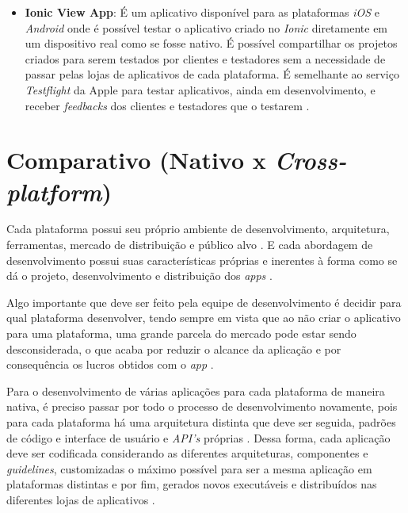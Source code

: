\begin{itemize}
    \item \textbf{Ionic View App}: É um aplicativo disponível para as plataformas \textit{iOS} e \textit{Android} onde é possível testar o 
    aplicativo criado no \textit{Ionic} diretamente em um dispositivo real como se fosse nativo. É possível compartilhar os projetos criados para serem
    testados por clientes e testadores sem a necessidade de passar pelas lojas de aplicativos de cada plataforma. É semelhante ao serviço 
    \textit{Testflight} da Apple para testar aplicativos, ainda em desenvolvimento, e receber \textit{feedbacks} dos clientes e testadores que o testarem \cite{drifty_ionic_2016-5}. 
     
\end{itemize}

\section{Comparativo (Nativo x \textit{Cross-platform})} \label{section:comparativo}



Cada plataforma possui seu próprio ambiente de desenvolvimento, arquitetura, ferramentas, mercado de distribuição e público alvo \cite{shakshuki_4th_2013}.
E cada abordagem de desenvolvimento possui suas características próprias e inerentes à forma como se dá o projeto, desenvolvimento e distribuição dos \textit{apps} \cite{corral_ant_2012}.

Algo importante que deve ser feito pela equipe de desenvolvimento é decidir para qual plataforma desenvolver, tendo sempre em vista que 
ao não criar o aplicativo para uma plataforma, uma grande parcela do mercado pode estar sendo desconsiderada, o que acaba por reduzir o alcance
da aplicação e por consequência os lucros obtidos com o \textit{app} \cite{corral_ant_2012}. 

Para o desenvolvimento de várias aplicações para cada plataforma de maneira nativa, é preciso passar por todo o processo de desenvolvimento novamente, 
pois para cada plataforma há uma arquitetura distinta que deve ser seguida, padrões de código e interface de usuário e \textit{API's} próprias \cite{holzinger_making_2012}.
Dessa forma, cada aplicação deve ser codificada considerando as diferentes arquiteturas, componentes e \textit{guidelines}, customizadas o máximo possível 
para ser a mesma aplicação em plataformas distintas e por fim, gerados novos executáveis e distribuídos nas diferentes lojas de aplicativos \cite{corral_ant_2012}.

